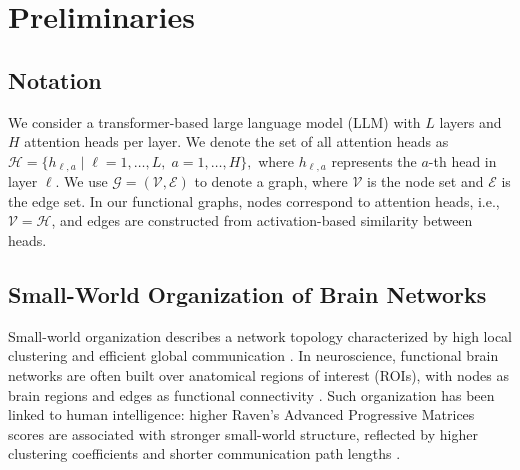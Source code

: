 \section{Preliminaries}
\label{sec:swa_prelim}

\subsection{Notation}

We consider a transformer-based large language model (LLM) with $L$ layers and $H$ attention heads per layer. We denote the set of all attention heads as
$
\mathcal{H} = \{h_{\ell,a} \mid \ell = 1, \ldots, L,\; a = 1, \ldots, H\},
$
where $h_{\ell,a}$ represents the $a$-th head in layer $\ell$. We use $\mathcal{G}=(\mathcal{V},\mathcal{E})$ to denote a graph, where $\mathcal{V}$ is the node set and $\mathcal{E}$ is the edge set. In our functional graphs, nodes correspond to attention heads, i.e., $\mathcal{V}=\mathcal{H}$, and edges are constructed from activation-based similarity between heads.

\subsection{Small-World Organization of Brain Networks}

Small-world organization describes a network topology characterized by high local clustering and efficient global communication \cite{barbey2018network, rosenberg2020functional}. In neuroscience, functional brain networks are often built over anatomical regions of interest (ROIs), with nodes as brain regions and edges as functional connectivity \cite{langer2012functional}. Such organization has been linked to human intelligence: higher Raven's Advanced Progressive Matrices scores \cite{bors2003effect, raven1962advanced} are associated with stronger small-world structure, reflected by higher clustering coefficients and shorter communication path lengths \cite{langer2012functional}.

